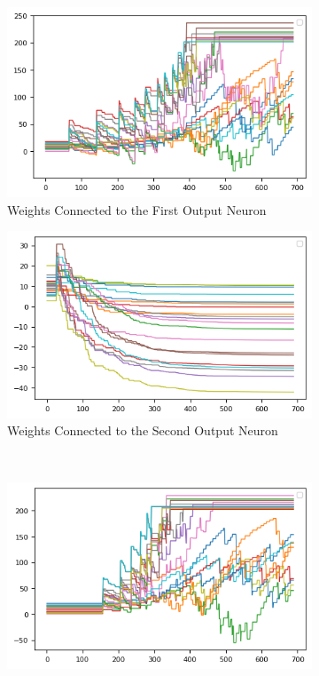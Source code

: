 \documentclass[12pt]{article}
\begin{document}
\begin{figure}[H]
\centering
  \begin{subfigure}[b]{0.45\textwidth}
    \includegraphics[width=\textwidth]{Figs/w1.png}
    \caption{Weights Connected to the First Output Neuron}
  \end{subfigure}
  \hspace*{10}
  \begin{subfigure}[b]{0.45\textwidth}
    \includegraphics[width=\textwidth]{Figs/w2.png}
    \caption{Weights Connected to the Second Output Neuron}
  \end{subfigure}
  \\[\smallskipamount]
  \begin{subfigure}[b]{0.45\textwidth}
    \includegraphics[width=\textwidth]{Figs/w3.png}

\end{subfigure}
\end{figure}
\end{document}
